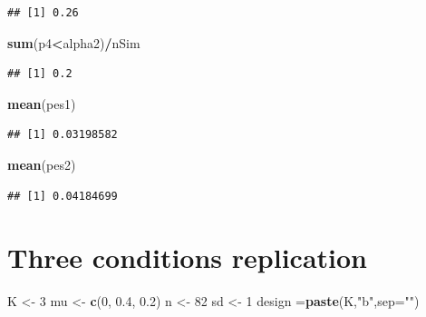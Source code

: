 \documentclass[]{book}
\newenvironment{Shaded}{\begin{snugshade}}{\end{snugshade}}
\newcommand{\DataTypeTok}[1]{\textcolor[rgb]{0.13,0.29,0.53}{#1}}
\newcommand{\DecValTok}[1]{\textcolor[rgb]{0.00,0.00,0.81}{#1}}
\newcommand{\FloatTok}[1]{\textcolor[rgb]{0.00,0.00,0.81}{#1}}
\newcommand{\KeywordTok}[1]{\textcolor[rgb]{0.13,0.29,0.53}{\textbf{#1}}}
\newcommand{\NormalTok}[1]{#1}
\newcommand{\OperatorTok}[1]{\textcolor[rgb]{0.81,0.36,0.00}{\textbf{#1}}}
\newcommand{\StringTok}[1]{\textcolor[rgb]{0.31,0.60,0.02}{#1}}
\begin{document}
\begin{verbatim}
## [1] 0.26
\end{verbatim}

\begin{Shaded}
\begin{Highlighting}[]
\KeywordTok{sum}\NormalTok{(p4}\OperatorTok{<}\NormalTok{alpha2)}\OperatorTok{/}\NormalTok{nSim}
\end{Highlighting}
\end{Shaded}

\begin{verbatim}
## [1] 0.2
\end{verbatim}

\begin{Shaded}
\begin{Highlighting}[]
\KeywordTok{mean}\NormalTok{(pes1)}
\end{Highlighting}
\end{Shaded}

\begin{verbatim}
## [1] 0.03198582
\end{verbatim}

\begin{Shaded}
\begin{Highlighting}[]
\KeywordTok{mean}\NormalTok{(pes2)}
\end{Highlighting}
\end{Shaded}

\begin{verbatim}
## [1] 0.04184699
\end{verbatim}

\hypertarget{three-conditions-replication-2}{%
\section{Three conditions replication}\label{three-conditions-replication-2}}

\begin{Shaded}
\begin{Highlighting}[]
\NormalTok{K <-}\StringTok{ }\DecValTok{3}
\NormalTok{mu <-}\StringTok{ }\KeywordTok{c}\NormalTok{(}\DecValTok{0}\NormalTok{, }\FloatTok{0.4}\NormalTok{, }\FloatTok{0.2}\NormalTok{)}
\NormalTok{n <-}\StringTok{ }\DecValTok{82}
\NormalTok{sd <-}\StringTok{ }\DecValTok{1}
\NormalTok{design =}\KeywordTok{paste}\NormalTok{(K,}\StringTok{"b"}\NormalTok{,}\DataTypeTok{sep=}\StringTok{""}\NormalTok{)}
\end{Highlighting}
\end{Shaded}
\end{document}
